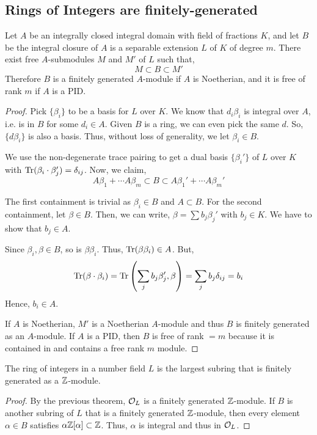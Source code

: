 \documentclass[12pt]{amsart}
\begin{document}
\subsection{Rings of Integers are finitely-generated}


\begin{proposition}
    Let $A$ be an integrally closed integral domain with field of fractions $K$, and let $B$ be the integral closure of $A$ is a separable extension $L$ of $K$ of degree $m$. There exist free $A$-submodules $M$ and $M'$ of $L$ such that, 
    \[ M \subset B \subset M' \]
    Therefore $B$ is a finitely generated $A$-module if $A$ is Noetherian, and it is free of rank $m$ if $A$ is a PID. 
\end{proposition}
\begin{proof}
    Pick $\{\beta_i\}$ to be a basis for $L$ over $K$. We know that $d_i\beta_i$ is integral over $A$, i.e. is in $B$ for some $d_i \in A$. Given $B$ is a ring, we can even pick the same $d$. So, $\{d\beta_i\}$ is also a basis. Thus, without loss of generality, we let $\beta_i \in B$. 

    We use the non-degenerate trace pairing to get a dual basis $\{\beta_i'\}$ of $L$ over $K$ with $\operatorname{Tr}(\beta_i \cdot \beta_j') = \delta_{ij}$. Now, we claim,
    \[ A\beta_1 + \cdots A\beta_m \subset B \subset A\beta_1' + \cdots A\beta_m' \]

    The first containment is trivial as $\beta_i \in B$ and $A \subset B$. For the second containment, let $\beta \in B$. Then, we can write, $\beta = \sum b_j\beta_j'$ with $b_j \in K$. We have to show that $b_j \in A$.
    
    Since $\beta_i, \beta \in B$, so is $\beta\beta_i$. Thus, $\operatorname{Tr}(\beta\beta_i) \in A$. But, 
    \begin{align*}
        \operatorname{Tr}(\beta \cdot \beta_i) = \operatorname{Tr}\left(\sum_j b_j\beta_j', \beta\right) = \sum_j b_j \delta_{ij} = b_i
    \end{align*}
    Hence, $b_i \in A$. 

    If $A$ is Noetherian, $M'$ is a Noetherian $A$-module and thus $B$ is finitely generated as an $A$-module. If $A$ is a PID, then $B$ is free of rank $= m$ because it is contained in and contains a free rank $m$ module.
\end{proof}


\begin{corollary}
    The ring of integers in a number field $L$ is the largest subring that is finitely generated as a $\mathbb Z$-module. 
\end{corollary}
\begin{proof}
    By the previous theorem, $\mathcal{O}_L$ is a finitely generated $\mathbb Z$-module. If $B$ is another subring of $L$ that is a finitely generated $\mathbb Z$-module, then every element $\alpha \in B$ satisfies $\alpha \mathbb Z[\alpha] \subset \mathbb Z$. Thus, $\alpha$ is integral and thus in $\mathcal{O}_L$.  
\end{proof}
\end{document}
